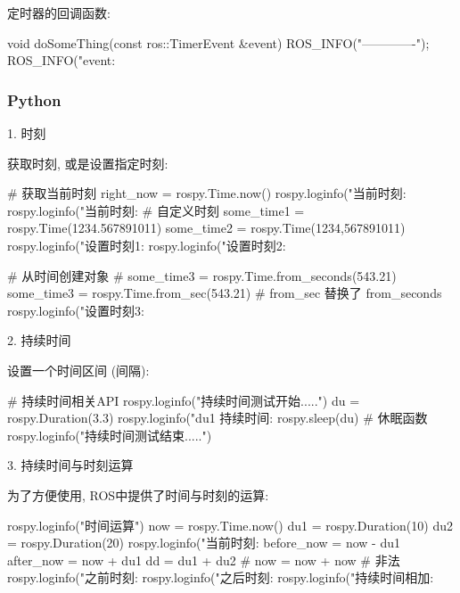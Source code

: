 \documentclass[openany, fontset=windowsold]{ctexbook}
\theoremstyle{kaiti}
\theoremstyle{normal}
\begin{document}
定时器的回调函数:

\begin{cpp}
  void doSomeThing(const ros::TimerEvent &event){
      ROS_INFO("-------------");
      ROS_INFO("event:%
  }
\end{cpp}

\subsubsection{Python}

1. 时刻

获取时刻, 或是设置指定时刻:

\begin{python}
  # 获取当前时刻
  right_now = rospy.Time.now()
  rospy.loginfo("当前时刻:%
  rospy.loginfo("当前时刻:%
  # 自定义时刻
  some_time1 = rospy.Time(1234.567891011)
  some_time2 = rospy.Time(1234,567891011)
  rospy.loginfo("设置时刻1:%
  rospy.loginfo("设置时刻2:%

  # 从时间创建对象
  # some_time3 = rospy.Time.from_seconds(543.21)
  some_time3 = rospy.Time.from_sec(543.21) # from_sec 替换了 from_seconds
  rospy.loginfo("设置时刻3:%
\end{python}

2. 持续时间

设置一个时间区间 (间隔):

\begin{python}
  # 持续时间相关API
  rospy.loginfo("持续时间测试开始.....")
  du = rospy.Duration(3.3)
  rospy.loginfo("du1 持续时间:%
  rospy.sleep(du) # 休眠函数
  rospy.loginfo("持续时间测试结束.....")
\end{python}

3. 持续时间与时刻运算

为了方便使用, ROS中提供了时间与时刻的运算:

\begin{python}
  rospy.loginfo("时间运算")
  now = rospy.Time.now()
  du1 = rospy.Duration(10)
  du2 = rospy.Duration(20)
  rospy.loginfo("当前时刻:%
  before_now = now - du1
  after_now = now + du1
  dd = du1 + du2
  # now = now + now # 非法
  rospy.loginfo("之前时刻:%
  rospy.loginfo("之后时刻:%
  rospy.loginfo("持续时间相加:%
\end{python}
\end{document}
